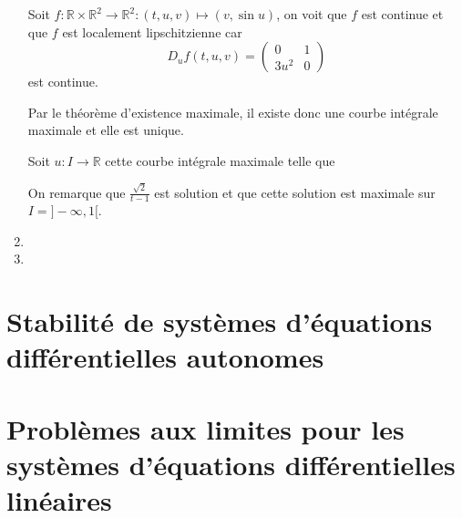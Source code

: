 \documentclass[fontsize=12pt]{article}
\begin{document}
\begin{enumerate}
    Soit $f:\mathbb{R}\times\mathbb{R}^2\to\mathbb{R}^2:
    (t,u,v)\mapsto(v,\sin u)$, on voit que $f$ est continue et que
    $f$ est localement lipschitzienne car
    \[ D_uf(t,u,v) =
      \begin{pmatrix}
        0 & 1\\
        3u^2 & 0
    \end{pmatrix} \]
    est continue.

    Par le théorème d'existence maximale, il existe donc une courbe intégrale
    maximale et elle est unique.

    Soit $u:I\to\mathbb{R}$ cette courbe intégrale maximale telle que

    On remarque que $\frac{\sqrt{2}}{t-1}$ est solution et que cette solution
    est maximale sur $I = ]-\infty,1[$.
  \item
  \item
\end{enumerate}

\section{Stabilité de systèmes d'équations différentielles autonomes}

\section{Problèmes aux limites pour les
systèmes d'équations différentielles linéaires}
\end{document}
